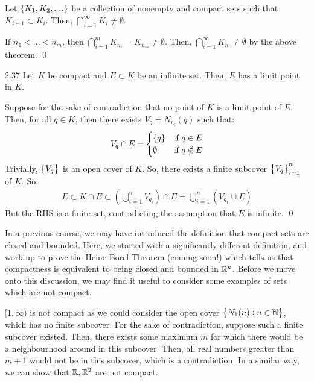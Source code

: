 \begin{ncorollary}{}{}
    Let $\set{K_1, K_2, \ldots}$ be a collection of nonempty and compact sets such that $K_{i+1} \subset K_i$. Then, $\bigcap_{i=1}^\infty K_i \neq \emptyset$.
\end{ncorollary}
\begin{nproof}
    If $n_1 < \ldots < n_m$, then $\bigcap_{i=1}^m K_{n_i} = K_{n_m} \neq \emptyset$. Then, $\bigcap_{i=1}^\infty K_{n_i} \neq \emptyset$ by the above theorem. \qed
\end{nproof}

\begin{theorem}{}{2.37}
    Let $K$ be compact and $E \subset K$ be an infinite set. Then, $E$ has a limit point in $K$.
\end{theorem}
\begin{nproof}
    Suppose for the sake of contradiction that no point of $K$ is a limit point of $E$. Then, for all $q \in K$, then there exists $V_q = N_{r_q}(q)$ such that:
    \begin{align*}
        V_q \cap E = \begin{cases}
            \set{q} & \text{if $q \in E$}
            \\ \emptyset & \text{if $q \notin E$}
        \end{cases}
    \end{align*}
    Trivially, $\set{V_q}$ is an open cover of $K$. So, there exists a finite subcover $\set{V_q}_{i=1}^n$ of $K$. So:
    \begin{align*}
        E \subset K \cap E \subset \left(\bigcup_{i=1}^n V_{q_i}\right) \cap E = \bigcup_{i=1}^n(V_{q_1} \cup E)
    \end{align*}
    But the RHS is a finite set, contradicting the assumption that $E$ is infinite. \qed
\end{nproof}
\noindent In a previous course, we may have introduced the definition that compact sets are closed and bounded. Here, we started with a significantly different definition, and work up to prove the Heine-Borel Theorem (coming soon!) which tells us that compactness is equivalent to being closed and bounded in $\mathbb{R}^k$. Before we move onto this discussion, we may find it useful to consider some examples of sets which are not compact. 

$[1, \infty)$ is not compact as we could consider the open cover $\set{N_1(n): n \in \mathbb{N}}$, which has no finite subcover. For the sake of contradiction, suppose such a finite subcover existed. Then, there exists some maximum $m$ for which there would be a neighbourhood around in this subcover. Then, all real numbers greater than $m+1$ would not be in this subcover, which is a contradiction. In a similar way, we can show that $\mathbb{R}, \mathbb{R}^2$ are not compact. 

